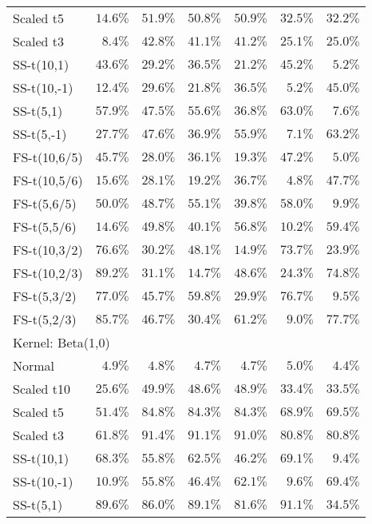 \begin{longtable}{lrrrrrr}
Scaled t5 & $14.6\%$ & $51.9\%$ & $50.8\%$ & $50.9\%$ & $32.5\%$ & $32.2\%$ \\ 
Scaled t3 & $8.4\%$ & $42.8\%$ & $41.1\%$ & $41.2\%$ & $25.1\%$ & $25.0\%$ \\ 
SS-t(10,1) & $43.6\%$ & $29.2\%$ & $36.5\%$ & $21.2\%$ & $45.2\%$ & $5.2\%$ \\ 
SS-t(10,-1) & $12.4\%$ & $29.6\%$ & $21.8\%$ & $36.5\%$ & $5.2\%$ & $45.0\%$ \\ 
SS-t(5,1) & $57.9\%$ & $47.5\%$ & $55.6\%$ & $36.8\%$ & $63.0\%$ & $7.6\%$ \\ 
SS-t(5,-1) & $27.7\%$ & $47.6\%$ & $36.9\%$ & $55.9\%$ & $7.1\%$ & $63.2\%$ \\ 
FS-t(10,6/5) & $45.7\%$ & $28.0\%$ & $36.1\%$ & $19.3\%$ & $47.2\%$ & $5.0\%$ \\ 
FS-t(10,5/6) & $15.6\%$ & $28.1\%$ & $19.2\%$ & $36.7\%$ & $4.8\%$ & $47.7\%$ \\ 
FS-t(5,6/5) & $50.0\%$ & $48.7\%$ & $55.1\%$ & $39.8\%$ & $58.0\%$ & $9.9\%$ \\ 
FS-t(5,5/6) & $14.6\%$ & $49.8\%$ & $40.1\%$ & $56.8\%$ & $10.2\%$ & $59.4\%$ \\ 
FS-t(10,3/2) & $76.6\%$ & $30.2\%$ & $48.1\%$ & $14.9\%$ & $73.7\%$ & $23.9\%$ \\ 
FS-t(10,2/3) & $89.2\%$ & $31.1\%$ & $14.7\%$ & $48.6\%$ & $24.3\%$ & $74.8\%$ \\ 
FS-t(5,3/2) & $77.0\%$ & $45.7\%$ & $59.8\%$ & $29.9\%$ & $76.7\%$ & $9.5\%$ \\ 
FS-t(5,2/3) & $85.7\%$ & $46.7\%$ & $30.4\%$ & $61.2\%$ & $9.0\%$ & $77.7\%$ \\ 
\midrule
\multicolumn{7}{l}{Kernel: Beta(1,0)} \\ 
\midrule
Normal & $4.9\%$ & $4.8\%$ & $4.7\%$ & $4.7\%$ & $5.0\%$ & $4.4\%$ \\ 
Scaled t10 & $25.6\%$ & $49.9\%$ & $48.6\%$ & $48.9\%$ & $33.4\%$ & $33.5\%$ \\ 
Scaled t5 & $51.4\%$ & $84.8\%$ & $84.3\%$ & $84.3\%$ & $68.9\%$ & $69.5\%$ \\ 
Scaled t3 & $61.8\%$ & $91.4\%$ & $91.1\%$ & $91.0\%$ & $80.8\%$ & $80.8\%$ \\ 
SS-t(10,1) & $68.3\%$ & $55.8\%$ & $62.5\%$ & $46.2\%$ & $69.1\%$ & $9.4\%$ \\ 
SS-t(10,-1) & $10.9\%$ & $55.8\%$ & $46.4\%$ & $62.1\%$ & $9.6\%$ & $69.4\%$ \\ 
SS-t(5,1) & $89.6\%$ & $86.0\%$ & $89.1\%$ & $81.6\%$ & $91.1\%$ & $34.5\%$ \\ 

\end{longtable}
